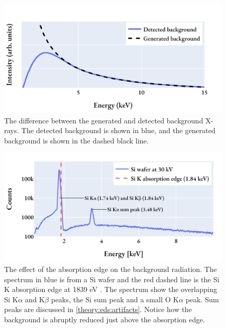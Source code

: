 \begin{figure}[pht]
    \centering
    \includegraphics[width=0.8\linewidth]{figures/background_generated_detected.png}
    \caption{
        The difference between the generated and detected background X-rays.
        The detected background is shown in blue, and the generated background is shown in the dashed black line.
    }
    \label{fig:background_xrays}
\end{figure}

\begin{figure}[pht]
    \centering
    \includegraphics[width=0.8\linewidth]{figures/background_absorptionEdge_Si.png}
    \caption{
        The effect of the absorption edge on the background radiation.
        The spectrum in blue is from a Si wafer and the red dashed line is the Si K absorption edge at 1839 eV \cite{absorptionEdges_1967,hyperspy_1.7.1}.
        The spectrum show the overlapping Si K$\alpha$ and K$\beta$ peaks, the Si sum peak and a small O K$\alpha$ peak.
        Sum peaks are discussed in \cref{theory:eds:artifacts}.
        Notice how the background is abruptly reduced just above the absorption edge.
    }
    \label{fig:background_absorptionEdgeSi}
\end{figure}




